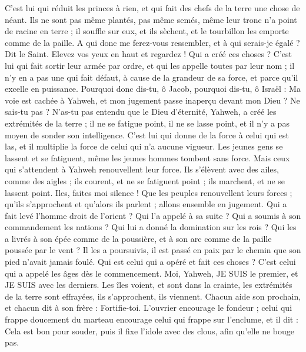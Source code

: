 \begin{multicols}{2}
C'est lui qui réduit les princes à rien, et qui fait des chefs de la terre une chose de néant.
Ils ne sont pas même plantés, pas même semés, même leur tronc n'a point de racine en terre ; il souffle sur eux, et ils sèchent, et le tourbillon les emporte comme de la paille.
A qui donc me ferez-vous ressembler, et à qui serais-je égalé ? Dit le Saint.
Elevez vos yeux en haut et regardez ! Qui a créé ces choses ? C'est lui qui fait sortir leur armée par ordre, et qui les appelle toutes par leur nom ; il n'y en a pas une qui fait défaut, à cause de la grandeur de sa force, et parce qu'il excelle en puissance.
Pourquoi donc dis-tu, ô Jacob, pourquoi dis-tu, ô Israël : Ma voie est cachée à Yahweh, et mon jugement passe inaperçu devant mon Dieu ?
Ne sais-tu pas ? N'as-tu pas entendu que le Dieu d'éternité, Yahweh, a créé les extrémités de la terre ; il ne se fatigue point, il ne se lasse point, et il n'y a pas moyen de sonder son intelligence.
C'est lui qui donne de la force à celui qui est las, et il multiplie la force de celui qui n'a aucune vigueur.
Les jeunes gens se lassent et se fatiguent, même les jeunes hommes tombent sans force.
Mais ceux qui s'attendent à Yahweh renouvellent leur force. Ils s'élèvent avec des ailes, comme des aigles ; ils courent, et ne se fatiguent point ; ils marchent, et ne se lassent point.
\VerseOne{}Iles, faites moi silence ! Que les peuples renouvellent leurs forces ; qu'ils s'approchent et qu'alors ils parlent ; allons ensemble en jugement.
Qui a fait levé l'homme droit de l'orient ? Qui l'a appelé à sa suite ? Qui a soumis à son commandement les nations ? Qui lui a donné la domination sur les rois ? Qui les a livrés à son épée comme de la poussière, et à son arc comme de la paille poussée par le vent ?
Il les a poursuivis, il est passé en paix par le chemin que son pied n'avait jamais foulé.
Qui est celui qui a opéré et fait ces choses ? C'est celui qui a appelé les âges dès le commencement. Moi, Yahweh, JE SUIS le premier, et JE SUIS avec les derniers.
Les îles voient, et sont dans la crainte, les extrémités de la terre sont effrayées, ils s'approchent, ils viennent.
Chacun aide son prochain, et chacun dit à son frère : Fortifie-toi.
L'ouvrier encourage le fondeur ; celui qui frappe doucement du marteau encourage celui qui frappe sur l'enclume, et il dit : Cela est bon pour souder, puis il fixe l'idole avec des clous, afin qu'elle ne bouge pas.

\end{multicols}
